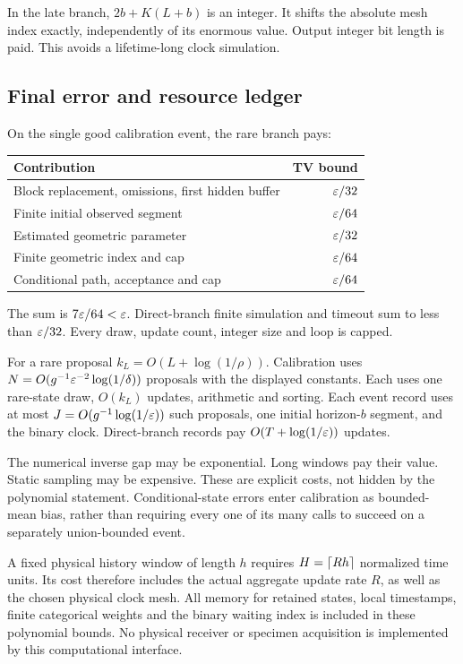 In the late branch, $2b+K(L+b)$ is an integer. It shifts the absolute mesh index exactly, independently of its enormous value. Output integer bit length is paid. This avoids a lifetime-long clock simulation.



\subsection{Final error and resource ledger}
On the single good calibration event, the rare branch pays:
\begin{center}
\begin{tabular}{lr}
\toprule
Contribution & TV bound\\
\midrule
Block replacement, omissions, first hidden buffer & $\varepsilon/32$\\
Finite initial observed segment & $\varepsilon/64$\\
Estimated geometric parameter & $\varepsilon/32$\\
Finite geometric index and cap & $\varepsilon/64$\\
Conditional path, acceptance and cap & $\varepsilon/64$\\
\bottomrule
\end{tabular}
\end{center}
The sum is $7\varepsilon/64<\varepsilon$. Direct-branch finite simulation and timeout sum to less than $\varepsilon/32$. Every draw, update count, integer size and loop is capped.

For a rare proposal $k_L=O(L+\log(1/\rho))$. Calibration uses $N=O(g^{-1}\varepsilon^{-2}\log(1/\delta))$ proposals with the displayed constants. Each uses one rare-state draw, $O(k_L)$ updates, arithmetic and sorting. Each event record uses at most $J=O(g^{-1}\log(1/\varepsilon))$ such proposals, one initial horizon-$b$ segment, and the binary clock. Direct-branch records pay $O(T+\log(1/\varepsilon))$ updates.

The numerical inverse gap may be exponential. Long windows pay their value. Static sampling may be expensive. These are explicit costs, not hidden by the polynomial statement. Conditional-state errors enter calibration as bounded-mean bias, rather than requiring every one of its many calls to succeed on a separately union-bounded event.

A fixed physical history window of length $h$ requires $H=\left\lceil Rh\right\rceil$ normalized time units. Its cost therefore includes the actual aggregate update rate $R$, as well as the chosen physical clock mesh. All memory for retained states, local timestamps, finite categorical weights and the binary waiting index is included in these polynomial bounds. No physical receiver or specimen acquisition is implemented by this computational interface.
